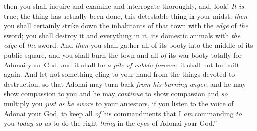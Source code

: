 \begin{biblechapter}
\verse then you shall inquire and examine and interrogate thoroughly, and, look! \textit{It is} true; the thing has actually been done, this detestable thing in your midst,
\verse \textit{then} you shall certainly strike down the inhabitants of that town with the \textit{edge} of \textit{the} sword; you shall destroy it and everything in it, its domestic animals with \textit{the} \textit{edge} of \textit{the} sword.
\verse And \textit{then} you shall gather all of its booty into the middle of its public square, and you shall burn the town and all \textit{of} its war-booty totally for Adonai your God, and it shall be \textit{a pile of rubble forever}; it shall not be built again.
\verse And let not something cling to your hand from the things devoted to destruction, so that Adonai may turn back \textit{from his burning anger}, and he may show compassion to you and he may \textit{continue} to show compassion and \textit{so} multiply you \textit{just as he swore} to your ancestors,
\verse if you listen to the voice of Adonai your God, to keep all \textit{of} his commandments that I \textit{am} commanding \textit{to} you \textit{today} \textit{so as} to do the right \textit{thing} in the eyes of Adonai your God.”
\end{biblechapter}

